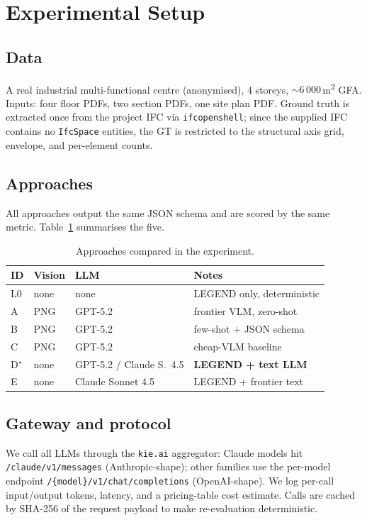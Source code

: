 \documentclass[conference]{IEEEtran}
\begin{document}
\section{Experimental Setup}
\subsection{Data}
A real industrial multi-functional centre (anonymised), 4 storeys,
$\sim 6\,000$\,m\textsuperscript{2} GFA. Inputs: four floor PDFs, two
section PDFs, one site plan PDF. Ground truth is extracted once from the
project IFC via \texttt{ifcopenshell}; since the supplied IFC contains no
\texttt{IfcSpace} entities, the GT is restricted to the structural axis grid,
envelope, and per-element counts.

\subsection{Approaches}
All approaches output the same JSON schema and are scored by the same
metric. Table~\ref{tab:setup} summarises the five.

\begin{table}[t]
\centering
\caption{Approaches compared in the experiment.}
\label{tab:setup}
\renewcommand{\arraystretch}{1.18}
\begin{tabular}{@{}llll@{}}
\toprule
\textbf{ID} & \textbf{Vision} & \textbf{LLM} & \textbf{Notes}\\
\midrule
L0 & none & none & LEGEND only, deterministic\\
A  & PNG  & GPT-5.2 & frontier VLM, zero-shot\\
B  & PNG  & GPT-5.2 & few-shot + JSON schema\\
C  & PNG  & GPT-5.2 & cheap-VLM baseline\\
D$^{\star}$ & none & GPT-5.2 / Claude S.\ 4.5 & \textbf{LEGEND + text LLM}\\
E  & none & Claude Sonnet 4.5 & LEGEND + frontier text\\
\bottomrule
\end{tabular}
\end{table}

\subsection{Gateway and protocol}
We call all LLMs through the \texttt{kie.ai} aggregator: Claude models hit
\texttt{/claude/v1/messages} (Anthropic-shape); other families use the
per-model endpoint \texttt{/\{model\}/v1/chat/completions}
(OpenAI-shape). We log per-call input/output tokens, latency, and a
pricing-table cost estimate. Calls are cached by SHA-256 of the request
payload to make re-evaluation deterministic.
\end{document}
